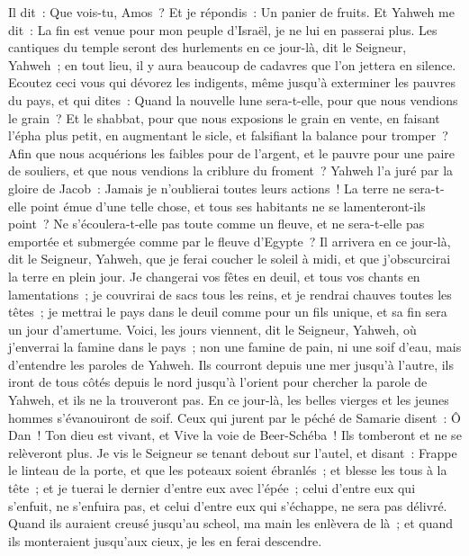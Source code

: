 \begin{multicols}{2}
Il dit~: Que vois-tu, Amos~? Et je répondis~: Un panier de fruits. Et Yahweh me dit~: La fin est venue pour mon peuple d'Israël, je ne lui en passerai plus.
Les cantiques du temple seront des hurlements en ce jour-là, dit le Seigneur, Yahweh~; en tout lieu, il y aura beaucoup de cadavres que l'on jettera en silence.
Ecoutez ceci vous qui dévorez les indigents, même jusqu'à exterminer les pauvres du pays,
et qui dites~: Quand la nouvelle lune sera-t-elle, pour que nous vendions le grain~? Et le shabbat, pour que nous exposions le grain en vente, en faisant l'épha plus petit, en augmentant le sicle, et falsifiant la balance pour tromper~?
Afin que nous acquérions les faibles pour de l'argent, et le pauvre pour une paire de souliers, et que nous vendions la criblure du froment~?
Yahweh l'a juré par la gloire de Jacob~: Jamais je n'oublierai toutes leurs actions~!
La terre ne sera-t-elle point émue d'une telle chose, et tous ses habitants ne se lamenteront-ils point~? Ne s'écoulera-t-elle pas toute comme un fleuve, et ne sera-t-elle pas emportée et submergée comme par le fleuve d'Egypte~?
Il arrivera en ce jour-là, dit le Seigneur, Yahweh, que je ferai coucher le soleil à midi, et que j'obscurcirai la terre en plein jour.
Je changerai vos fêtes en deuil, et tous vos chants en lamentations~; je couvrirai de sacs tous les reins, et je rendrai chauves toutes les têtes~; je mettrai le pays dans le deuil comme pour un fils unique, et sa fin sera un jour d'amertume.
Voici, les jours viennent, dit le Seigneur, Yahweh, où j'enverrai la famine dans le pays~; non une famine de pain, ni une soif d'eau, mais d'entendre les paroles de Yahweh.
Ils courront depuis une mer jusqu'à l'autre, ils iront de tous côtés depuis le nord jusqu'à l'orient pour chercher la parole de Yahweh, et ils ne la trouveront pas.
En ce jour-là, les belles vierges et les jeunes hommes s'évanouiront de soif.
Ceux qui jurent par le péché de Samarie disent~: Ô Dan~! Ton dieu est vivant, et Vive la voie de Beer-Schéba~! Ils tomberont et ne se relèveront plus.
\VerseOne{}Je vis le Seigneur se tenant debout sur l'autel, et disant~: Frappe le linteau de la porte, et que les poteaux soient ébranlés~; et blesse les tous à la tête~; et je tuerai le dernier d'entre eux avec l'épée~; celui d'entre eux qui s'enfuit, ne s'enfuira pas, et celui d'entre eux qui s'échappe, ne sera pas délivré.
Quand ils auraient creusé jusqu'au scheol, ma main les enlèvera de là~; et quand ils monteraient jusqu'aux cieux, je les en ferai descendre.

\end{multicols}
